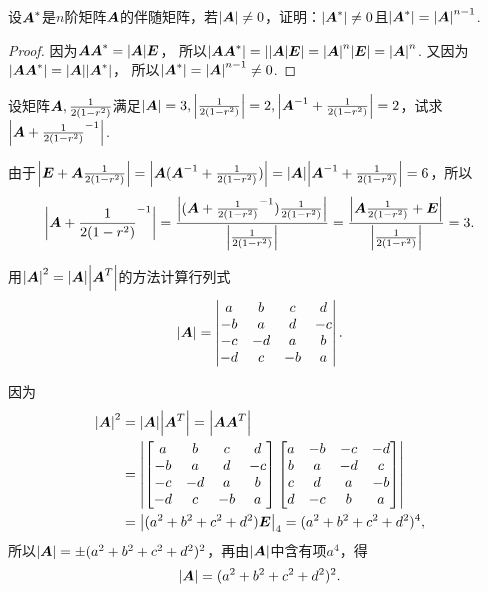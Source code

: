 \begin{example}
设\(\A^*\)是\(n\)阶矩阵\(\A\)的伴随矩阵，若\(\abs{\A} \neq 0\)，证明：\(\abs{\A^*} \neq 0\)且\(\abs{\A^*}=\abs{\A}^{n-1}\).
\begin{proof}
因为\(\A \A^* = \abs{\A} \E\)，%
所以\(\abs{\A \A^*} = \abs{\abs{\A} \E} = \abs{\A}^n \abs{\E} = \abs{\A}^n\).
又因为\(\abs{\A \A^*} = \abs{\A} \abs{\A^*}\)，%
所以\(\abs{\A^*} = \abs{\A}^{n-1} \neq 0\).
\end{proof}
\end{example}

\begin{example}
设矩阵\(\A,\B\)满足\(\abs{\A}=3,\abs{\B}=2,\abs{\A^{-1}+\B}=2\)，试求\(\abs{\A+\B^{-1}}\).
\begin{solution}
由于\(\abs{\E+\A\B} = \abs{\A(\A^{-1}+\B)} = \abs{\A} \abs{\A^{-1}+\B} = 6\)，所以\[
\abs{\A+\B^{-1}}
= \frac{\abs{(\A+\B^{-1})\B}}{\abs{\B}}
= \frac{\abs{\A\B+\E}}{\abs{\B}}
= 3.
\]
\end{solution}
\end{example}

\begin{example}
用\(\abs{\A}^2 = \abs{\A} \abs{\A^T}\)的方法计算行列式\[
\abs{\A} = \begin{vmatrix}
a & b & c & d \\
-b & a & d & -c \\
-c & -d & a & b \\
-d & c & -b & a
\end{vmatrix}.
\]
\begin{solution}
因为\begin{align*}
\abs{\A}^2 &= \abs{\A} \abs{\A^T} = \abs{\A \A^T} \\
&= \abs{\begin{bmatrix}
a & b & c & d \\
-b & a & d & -c \\
-c & -d & a & b \\
-d & c & -b & a
\end{bmatrix} \begin{bmatrix}
a & -b & -c & -d \\
b & a & -d & c \\
c & d & a & -b \\
d & -c & b & a
\end{bmatrix}} \\
&= \abs{(a^2+b^2+c^2+d^2) \E}_4
= (a^2+b^2+c^2+d^2)^4,
\end{align*}所以\(\abs{\A} = \pm(a^2+b^2+c^2+d^2)^2\)，再由\(\abs{\A}\)中含有项\(a^4\)，得\[
\abs{\A} = (a^2+b^2+c^2+d^2)^2.
\]
\end{solution}
\end{example}

